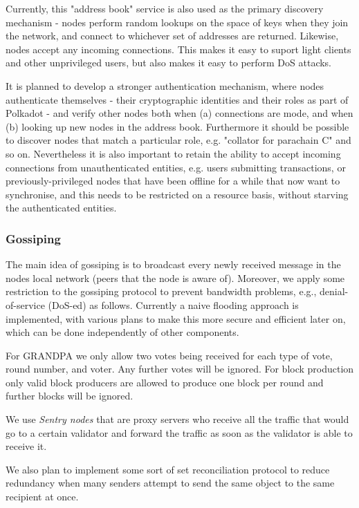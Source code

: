 Currently, this "address book" service is also used as the primary discovery mechanism - nodes perform random lookups on the space of keys when they join the network, and connect to whichever set of addresses are returned. Likewise, nodes accept any incoming connections. This makes it easy to suport light clients and other unprivileged users, but also makes it easy to perform DoS attacks.

It is planned to develop a stronger authentication mechanism, where nodes authenticate themselves - their cryptographic identities and their roles as part of Polkadot - and verify other nodes both when (a) connections are mode, and when (b) looking up new nodes in the address book. Furthermore it should be possible to discover nodes that match a particular role, e.g. "collator for parachain C" and so on. Nevertheless it is also important to retain the ability to accept incoming connections from unauthenticated entities, e.g. users submitting transactions, or previously-privileged nodes that have been offline for a while that now want to synchronise, and this needs to be restricted on a resource basis, without starving the authenticated entities.

\subsubsection{Gossiping}
The main idea of gossiping is to broadcast every newly received message in the nodes local network (peers that the node is aware of). Moreover, we apply some restriction to the gossiping protocol to prevent bandwidth problems, e.g., denial-of-service (DoS-ed) as follows. Currently a naive flooding approach is implemented, with various plans to make this more secure and efficient later on, which can be done independently of other components.

For GRANDPA we only allow two votes being received for each type of vote, round number, and voter. Any further votes will be ignored. For block production only valid block producers are allowed to produce one block per round and further blocks will be ignored.

We use \emph{Sentry nodes} that are proxy servers who receive all the traffic that would go to a certain validator and forward the traffic as soon as the validator is able to receive it.

We also plan to implement some sort of set reconciliation protocol to reduce redundancy when many senders attempt to send the same object to the same recipient at once.

